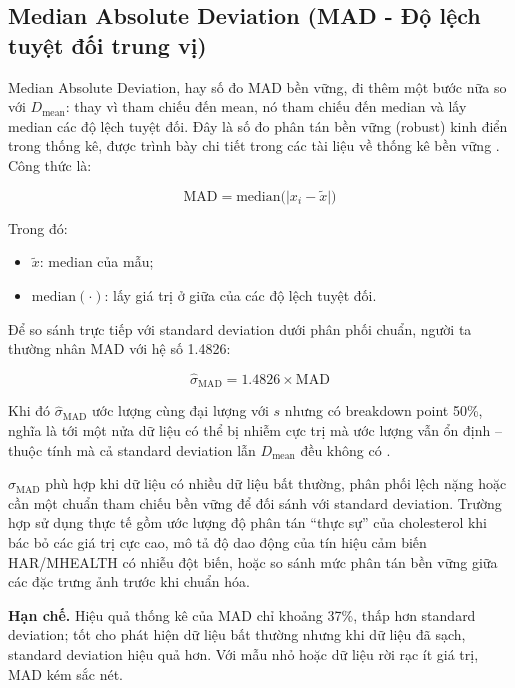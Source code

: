 \subsection{Median Absolute Deviation (MAD - Độ lệch tuyệt đối trung vị)}

Median Absolute Deviation, hay số đo MAD bền vững, đi thêm một bước nữa so với $D_{\text{mean}}$: thay vì tham chiếu đến mean, nó tham chiếu đến median và lấy median các độ lệch tuyệt đối. Đây là số đo phân tán bền vững (robust) kinh điển trong thống kê, được trình bày chi tiết trong các tài liệu về thống kê bền vững \cite{Huber2009Robust,Rousseeuw1993Alternatives}. Công thức là:

\begin{equation}
\text{MAD} = \text{median}\bigl(\lvert x_i - \tilde{x} \rvert\bigr)
\end{equation}

Trong đó:
\begin{itemize}[leftmargin=1.6em,label=\textbullet]
 \item $\tilde{x}$: median của mẫu;
 \item $\text{median}(\cdot)$: lấy giá trị ở giữa của các độ lệch tuyệt đối.
\end{itemize}

Để so sánh trực tiếp với standard deviation dưới phân phối chuẩn, người ta thường nhân MAD với hệ số 1.4826:

\begin{equation}
\hat{\sigma}_{\text{MAD}} = 1.4826 \times \text{MAD}
\end{equation}

Khi đó $\hat{\sigma}_{\text{MAD}}$ ước lượng cùng đại lượng với $s$ nhưng có breakdown point 50\%, nghĩa là tới một nửa dữ liệu có thể bị nhiễm cực trị mà ước lượng vẫn ổn định -- thuộc tính mà cả standard deviation lẫn $D_{\text{mean}}$ đều không có \cite{Rousseeuw1993Alternatives}.

$\hat{\sigma}_{\text{MAD}}$ phù hợp khi dữ liệu có nhiều dữ liệu bất thường, phân phối lệch nặng hoặc cần một chuẩn tham chiếu bền vững để đối sánh với standard deviation. Trường hợp sử dụng thực tế gồm ước lượng độ phân tán ``thực sự'' của cholesterol khi bác bỏ các giá trị cực cao, mô tả độ dao động của tín hiệu cảm biến HAR/MHEALTH có nhiễu đột biến, hoặc so sánh mức phân tán bền vững giữa các đặc trưng ảnh trước khi chuẩn hóa.

\textbf{Hạn chế.} Hiệu quả thống kê của MAD chỉ khoảng 37\%, thấp hơn standard deviation; tốt cho phát hiện dữ liệu bất thường nhưng khi dữ liệu đã sạch, standard deviation hiệu quả hơn. Với mẫu nhỏ hoặc dữ liệu rời rạc ít giá trị, MAD kém sắc nét.

